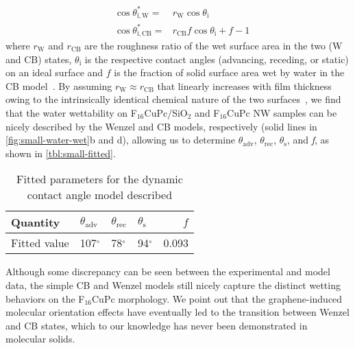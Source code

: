 \begin{eqnarray}
\label{eq:small-2}
&\cos \theta^{*}_{\mathrm{i,W}} =& r_{\mathrm{W}} \cos \theta_{\mathrm{i}} \\
&\cos \theta^{*}_{\mathrm{i,CB}} =& r_{\mathrm{CB}} f \cos \theta_{\mathrm{i}} + f - 1
\end{eqnarray}
where \(r_{\mathrm{W}}\) and \(r_{\mathrm{CB}}\) are the roughness
ratio of the wet surface area in the two (W and CB) states,
\(\theta_{\mathrm{i}}\) is the respective contact angles (advancing,
receding, or static) on an ideal surface and \(f\) is the fraction of
solid surface area wet by water in the CB
model~\autocite{Yeh_2008_CBW_hys,McHale_2004,Joanny_1984,Patankar_2010_CBW_hys}.
%
By assuming \(r_{\mathrm{W}} \approx r_{\mathrm{CB}}\) that linearly
increases with film thickness owing to the intrinsically identical
chemical nature of the two surfaces~\autocite{Yeh_2008_CBW_hys}, we
find that the water wettability on
F\(_{\text{16}}\)CuPc/SiO\(_{\text{2}}\) and F\(_{\text{16}}\)CuPc NW
samples can be nicely described by the Wenzel and CB models,
respectively (solid lines in \autoref{fig:small-water-wet}b and d), allowing us
to determine \(\theta_{\mathrm{adv}}\), \(\theta_{\mathrm{rec}}\),
\(\theta_{\mathrm{s}}\), and \emph{f}, as shown
in \autoref{tbl:small-fitted}.
%
\begin{table}[!htbp]
\caption{\label{tbl:small-fitted}
Fitted parameters for the dynamic contact angle model described}
\centering
\begin{tabular}{llllr}
\hline
Quantity & \(\theta_{\mathrm{adv}}\) & \(\theta_{\mathrm{rec}}\) & \(\theta_{\mathrm{s}}\) & \(f\) \\
\hline
Fitted value & 107\(^{\circ}\) & 78\(^{\circ}\) & 94\(^{\circ}\) & 0.093 \\
\hline
\end{tabular}
\end{table}
%
Although some discrepancy
can be seen between the experimental and model data, the simple CB
and Wenzel models still nicely capture the distinct wetting behaviors
on the F\(_{\text{16}}\)CuPc morphology. We point out that the
graphene-induced molecular orientation effects have eventually led to
the transition between Wenzel and CB states, which to our knowledge
has never been demonstrated in molecular solids.


